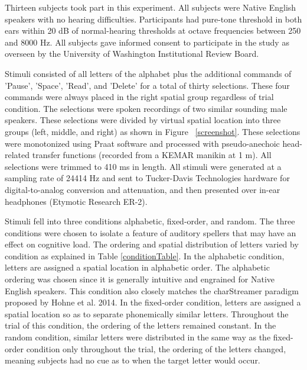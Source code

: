 \documentclass[10pt]{article}
\begin{document}
Thirteen subjects took part in this experiment.  All subjects were
Native English speakers with no hearing difficulties.  Participants
had pure-tone threshold in both ears within 20 dB of normal-hearing
thresholds at octave frequencies between 250 and 8000 Hz.  All
subjects gave informed consent to participate in the study as
overseen by the University of Washington Institutional Review Board.

Stimuli consisted of all letters of the alphabet plus the
additional commands of 'Pause', 'Space', 'Read', and 'Delete'
for a total of thirty selections.  These four commands were
always placed in the right spatial group regardless of trial
condition.  The selections were spoken recordings of two
similar sounding male speakers.  These selections were divided
by virtual spatial location into three groups (left, middle,
and right) as shown in Figure ~\ref{screenshot}.  These
selections were monotonized using Praat software and processed
with pseudo-anechoic head-related transfer functions (recorded
from a KEMAR manikin at 1 m).  All selections were trimmed to
410 ms in length.  All stimuli were generated at a
sampling rate of 24414 Hz and sent to Tucker-Davis
Technologies hardware for digital-to-analog conversion and
attenuation, and then presented over in-ear headphones
(Etymotic Research ER-2).

Stimuli fell into three conditions alphabetic, fixed-order, and
random.  The three conditions were chosen to isolate a feature of
auditory spellers that may have an effect on cognitive load.  The
ordering and spatial distribution of letters varied by condition as
explained in Table \ref{conditionTable}.  In the alphabetic
condition, letters are assigned a spatial location in alphabetic
order.  The alphabetic ordering was chosen since it is generally
intuitive and engrained for Native English speakers.  This condition
also closely matches the charStreamer paradigm proposed by Hohne et
al.  2014\cite{Hohne2014}.  In the fixed-order condition, letters
are assigned a spatial location so as to separate phonemically
similar letters.  Throughout the trial of this condition, the ordering
of the letters remained constant.  In the random condition, similar letters
were distributed in the same way as the fixed-order
condition only throughout the trial, the ordering of the letters
changed, meaning subjects had no cue as to when the target letter
would occur. 
\end{document}
